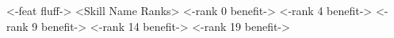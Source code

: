 { <-feat fluff-> }
{ <Skill Name Ranks> }
{ <-rank 0 benefit-> }
{ <-rank 4 benefit-> }
{ <-rank 9 benefit-> }
{ <-rank 14 benefit-> }
{ <-rank 19 benefit-> }